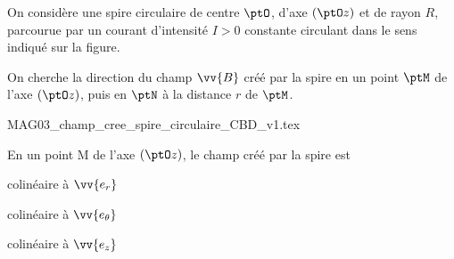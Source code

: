                                 \initialisationPartieGauche %
On considère une spire circulaire de centre $\ptO$, d'axe $(\ptO z)$ et de rayon $R$, parcourue par un courant d'intensité $I>0$ constante circulant dans le sens indiqué sur la figure.

On cherche la direction du champ $\vv{B}$ créé par la spire en un point $\ptM$ de l'axe $(\ptO z)$, puis en $\ptN$ à la distance $r$ de $\ptM$.

                                \initialisationPartieDroite %
% 
\begin{center}
{MAG03_champ_cree_spire_circulaire_CBD_v1.tex}
\end{center}                                                          
%
% 
                               \finalisationDuPartageDePage %


\debutEntrainement

\begin{enonce}
En un point M de l'axe $(\ptO z)$, le champ créé par la spire est
	\begin{listeQCM3Colonnes}
		\item colinéaire à $\vv{e_r}$
		\item colinéaire à $\vv{e_\theta}$
		\item colinéaire à $\vv{e_z}$
	\end{listeQCM3Colonnes}
\bigskip
\end{enonce}

